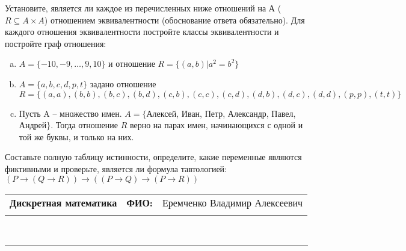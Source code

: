 \documentclass[10pt]{exam}
\newcommand{\class}{Дискретная математика}
\newcommand{\examdate}{}
\begin{document}
\begin{questions}
\question
Установите, является ли каждое из перечисленных ниже отношений на А ($R \subseteq A \times A$) отношением эквивалентности (обоснование ответа обязательно). Для каждого отношения эквивалентности постройте классы 
эквивалентности и постройте граф отношения:
\begin{enumerate} [a)]\setcounter{enumi}{0}
\item $A = \{-10, -9, … , 9, 10\}$ и отношение $R = \{(a,b)|a^{2} = b^{2}\}$
\item $A = \{a, b, c, d, p, t\}$ задано отношение $R = \{(a, a), (b, b), (b, c), (b, d), (c, b), (c, c), (c, d), (d, b), (d, c), (d, d), (p,p), (t,t)\}$
\item Пусть A – множество имен. $A = \{ $Алексей, Иван, Петр, Александр, Павел, Андрей$ \}$. Тогда отношение $R$ верно на парах имен, начинающихся с одной и той же буквы, и только на них.
\end{enumerate}\question Составьте полную таблицу истинности, определите, какие переменные являются фиктивными и проверьте, является ли формула тавтологией:
$(P \rightarrow (Q \rightarrow R)) \rightarrow ((P \rightarrow Q) \rightarrow (P \rightarrow R))$

\end{questions}
\newpage
\begin{flushright}
\begin{tabular}{p{2.8in} r l}
\textbf{\class} & \textbf{ФИО:} &Еремченко Владимир Алексеевич
\\

\textbf{\examdate} &&\\
\end{tabular}\\
\end{flushright}
\rule[1ex]{\textwidth}{.1pt}
\end{document}

